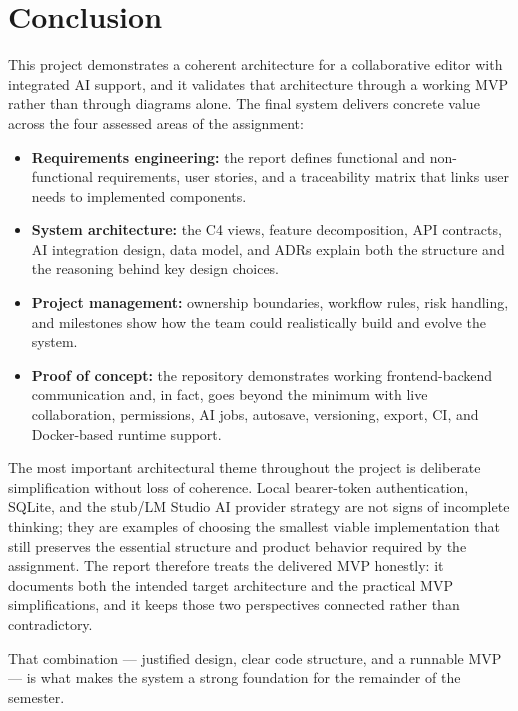 \chapter{Conclusion}

This project demonstrates a coherent architecture for a collaborative editor with integrated AI support,
and it validates that architecture through a working MVP rather than through diagrams alone. The final
system delivers concrete value across the four assessed areas of the assignment:

\begin{itemize}
  \item \textbf{Requirements engineering:} the report defines functional and non-functional requirements,
  user stories, and a traceability matrix that links user needs to implemented components.
  \item \textbf{System architecture:} the C4 views, feature decomposition, API contracts, AI integration
  design, data model, and ADRs explain both the structure and the reasoning behind key design choices.
  \item \textbf{Project management:} ownership boundaries, workflow rules, risk handling, and milestones show
  how the team could realistically build and evolve the system.
  \item \textbf{Proof of concept:} the repository demonstrates working frontend-backend communication and, in
  fact, goes beyond the minimum with live collaboration, permissions, AI jobs, autosave, versioning,
  export, CI, and Docker-based runtime support.
\end{itemize}

The most important architectural theme throughout the project is deliberate simplification without loss of
coherence. Local bearer-token authentication, SQLite, and the stub/LM Studio AI provider strategy are
not signs of incomplete thinking; they are examples of choosing the smallest viable implementation that
still preserves the essential structure and product behavior required by the assignment. The report
therefore treats the delivered MVP honestly: it documents both the intended target architecture and the
practical MVP simplifications, and it keeps those two perspectives connected rather than contradictory.

That combination --- justified design, clear code structure, and a runnable MVP --- is what makes the
system a strong foundation for the remainder of the semester.
